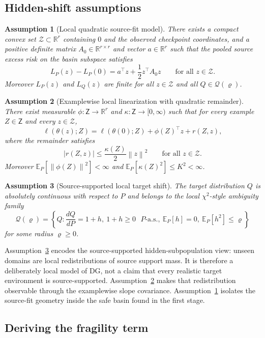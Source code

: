 \documentclass{article}
\newtheorem{assumption}{Assumption}
\newcommand{\RR}{\mathbb{R}}
\newcommand{\EE}{\mathbb{E}}
\newcommand{\cQ}{\mathcal{Q}}
\newcommand{\cZ}{\mathcal{Z}}
\newcommand{\sZ}{\mathsf{Z}}
\newcommand{\loss}{\ell}
\newcommand{\norm}[1]{\left\lVert #1 \right\rVert}
\newcommand{\abs}[1]{\left\lvert #1 \right\rvert}
\newcommand{\braces}[1]{\left\{ #1 \right\}}
\begin{document}
\subsection{Hidden-shift assumptions}

\begin{assumption}[Local quadratic source-fit model]
\label{ass:fit}
There exists a compact convex set \(\cZ \subset \RR^r\) containing \(0\) and the observed checkpoint coordinates, and a positive definite matrix \(A_0\in\RR^{r\times r}\) and vector \(a\in\RR^r\) such that the pooled source excess risk on the basin subspace satisfies
\[
L_P(z) - L_P(0)
=
a^\top z + \frac12 z^\top A_0 z
\qquad
\text{for all } z\in\cZ.
\]
Moreover \(L_P(z)\) and \(L_Q(z)\) are finite for all \(z\in\cZ\) and all \(Q\in\cQ(\varrho)\).
\end{assumption}

\begin{assumption}[Examplewise local linearization with quadratic remainder]
\label{ass:lin}
There exist measurable \(\phi : \sZ\to\RR^r\) and \(\kappa : \sZ\to[0,\infty)\) such that for every example \(Z\in\sZ\) and every \(z\in\cZ\),
\[
\loss(\theta(z);Z)
=
\loss(\theta(0);Z)
+
\phi(Z)^\top z
+
r(Z,z),
\]
where the remainder satisfies
\[
\abs{r(Z,z)} \le \frac{\kappa(Z)}{2}\norm{z}^2
\qquad
\text{for all } z\in\cZ.
\]
Moreover \(\EE_P[\norm{\phi(Z)}^2] < \infty\) and
\(\EE_P[\kappa(Z)^2] \le K^2 < \infty\).
\end{assumption}

\begin{assumption}[Source-supported local target shift]
\label{ass:shift}
The target distribution \(Q\) is absolutely continuous with respect to \(P\) and belongs to the local \(\chi^2\)-style ambiguity family
\[
\cQ(\varrho)
=
\braces{
Q : \frac{dQ}{dP} = 1+h,\ 1+h\ge 0 \text{ $P$-a.s.},\ \EE_P[h]=0,\ \EE_P[h^2]\le \varrho
}
\]
for some radius \(\varrho \ge 0\).
\end{assumption}

Assumption~\ref{ass:shift} encodes the source-supported hidden-subpopulation view: unseen domains are local redistributions of source support mass. It is therefore a deliberately local model of DG, not a claim that every realistic target environment is source-supported. Assumption~\ref{ass:lin} makes that redistribution observable through the examplewise slope covariance. Assumption~\ref{ass:fit} isolates the source-fit geometry inside the safe basin found in the first stage.

\subsection{Deriving the fragility term}
\end{document}
